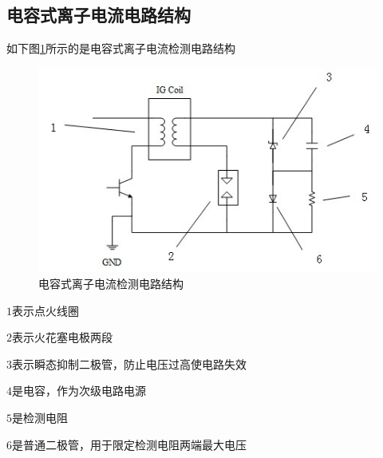 \subsection{电容式离子电流电路结构}
如下图\ref{fig:ionstruct}所示的是电容式离子电流检测电路结构
\begin{figure}[!h]
	\centering
	\includegraphics{thesis_figure/ion_struct}
	\caption{电容式离子电流检测电路结构}
	\label{fig:ionstruct}
\end{figure}
\par $1$表示点火线圈
\par $2$表示火花塞电极两段
\par $3$表示瞬态抑制二极管，防止电压过高使电路失效
\par $4$是电容，作为次级电路电源
\par $5$是检测电阻
\par $6$是普通二极管，用于限定检测电阻两端最大电压
